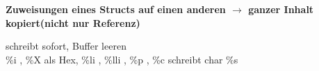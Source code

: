 \textbf{Zuweisungen eines Structs auf einen anderen $\rightarrow$ ganzer Inhalt kopiert(nicht nur Referenz)}


 schreibt sofort,  Buffer leeren\\
\%i , \%X  als Hex, \%li , \%lli , \%p , \%c  schreibt char \%s 